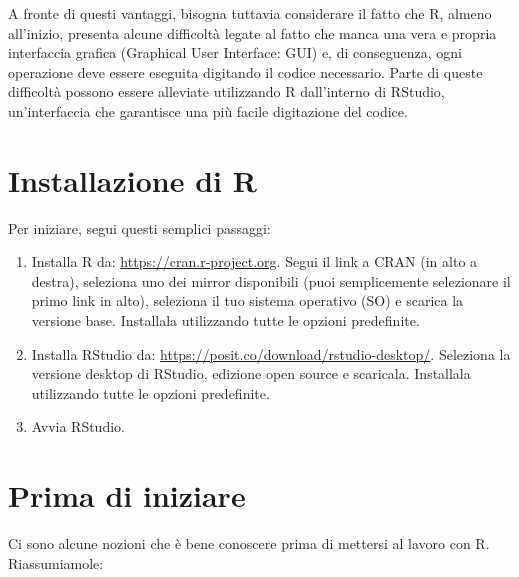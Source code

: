 \documentclass[
  12pt,
]{book}
\providecommand{\tightlist}{%
  \setlength{\itemsep}{0pt}\setlength{\parskip}{0pt}}
\begin{document}
A fronte di questi vantaggi, bisogna tuttavia considerare il fatto che R, almeno all'inizio, presenta alcune difficoltà legate al fatto che manca una vera e propria interfaccia grafica (Graphical User Interface: GUI) e, di conseguenza, ogni operazione deve essere eseguita digitando il codice necessario. Parte di queste difficoltà possono essere alleviate utilizzando R dall'interno di RStudio, un'interfaccia che garantisce una più facile digitazione del codice.

\hypertarget{installazione-di-r}{%
\section*{Installazione di R}\label{installazione-di-r}}

Per iniziare, segui questi semplici passaggi:

\begin{enumerate}
\def\labelenumi{\arabic{enumi}.}
\tightlist
\item
  Installa R da: \url{https://cran.r-project.org}. Segui il link a CRAN (in alto a destra), seleziona uno dei mirror disponibili (puoi semplicemente selezionare il primo link in alto), seleziona il tuo sistema operativo (SO) e scarica la versione base. Installala utilizzando tutte le opzioni predefinite.
\item
  Installa RStudio da: \url{https://posit.co/download/rstudio-desktop/}. Seleziona la versione desktop di RStudio, edizione open source e scaricala. Installala utilizzando tutte le opzioni predefinite.
\item
  Avvia RStudio.
\end{enumerate}

\hypertarget{prima-di-iniziare}{%
\section{Prima di iniziare}\label{prima-di-iniziare}}

Ci sono alcune nozioni che è bene conoscere prima di mettersi al lavoro con R. Riassumiamole:
\end{document}
